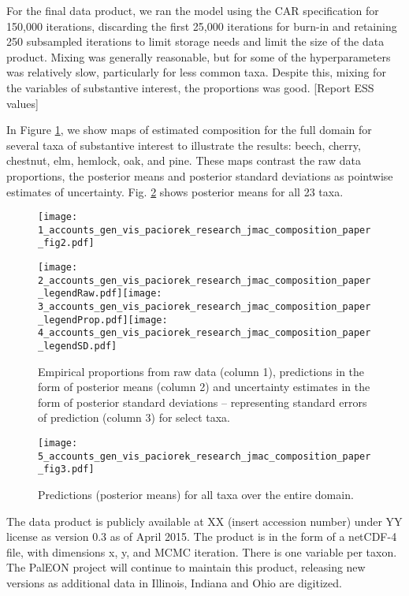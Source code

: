 \documentclass[12pt]{article}\usepackage[]{graphicx}\usepackage[]{color}
\begin{document}
For the final data product, we ran the model using the CAR specification
for 150,000 iterations, discarding the first 25,000 iterations for
burn-in and retaining 250 subsampled iterations to limit storage needs
and limit the size of the data product. Mixing was generally reasonable,
but for some of the hyperparameters was relatively slow, particularly
for less common taxa. Despite this, mixing for the variables of substantive
interest, the proportions was good. {[}Report ESS values{]}

In Figure \ref{fig:select_maps}, we show maps of estimated composition
for the full domain for several taxa of substantive interest to illustrate
the results: beech, cherry, chestnut, elm, hemlock, oak, and pine.
These maps contrast the raw data proportions, the posterior means
and posterior standard deviations as pointwise estimates of uncertainty.
Fig. \ref{fig:all_predictions} shows posterior means for all 23 taxa.

\begin{figure}
\label{fig:select_maps}

\texttt{[image: 1\_accounts\_gen\_vis\_paciorek\_research\_jmac\_composition\_paper\_fig2.pdf]}

\hspace{4mm}\texttt{[image: 2\_accounts\_gen\_vis\_paciorek\_research\_jmac\_composition\_paper\_legendRaw.pdf]}\hspace{4mm}\texttt{[image: 3\_accounts\_gen\_vis\_paciorek\_research\_jmac\_composition\_paper\_legendProp.pdf]}\hspace{3.5mm}\texttt{[image: 4\_accounts\_gen\_vis\_paciorek\_research\_jmac\_composition\_paper\_legendSD.pdf]}

\caption{Empirical proportions from raw data (column 1), predictions in the
form of posterior means (column 2) and uncertainty estimates in the
form of posterior standard deviations -- representing standard errors
of prediction (column 3) for select taxa.}
\end{figure}


\begin{figure}
\label{fig:all_predictions}

\texttt{[image: 5\_accounts\_gen\_vis\_paciorek\_research\_jmac\_composition\_paper\_fig3.pdf]}

\caption{Predictions (posterior means) for all taxa over the entire domain.}


\end{figure}


The data product is publicly available at XX (insert accession number)
under YY license as version 0.3 as of April 2015. The product is in
the form of a netCDF-4 file, with dimensions x, y, and MCMC iteration.
There is one variable per taxon. The PalEON project will continue
to maintain this product, releasing new versions as additional data
in Illinois, Indiana and Ohio are digitized. 
\end{document}
